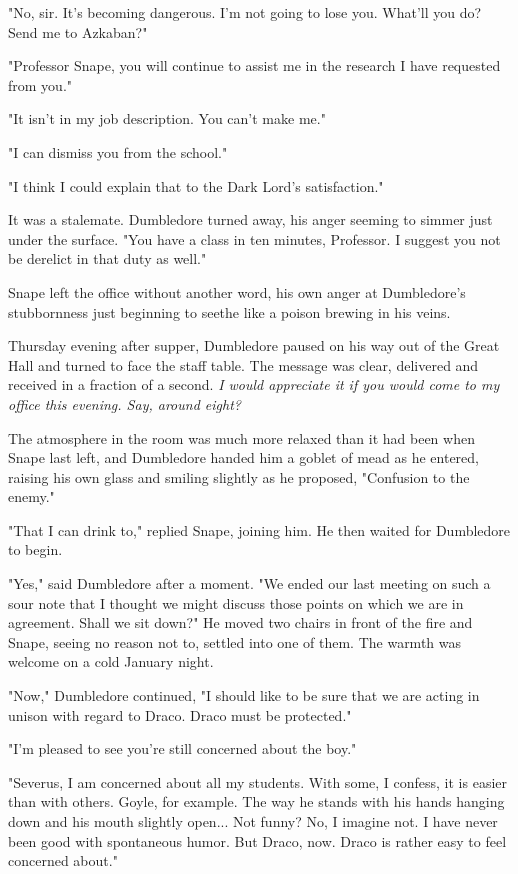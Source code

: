 \documentclass[a4paper,11pt]{article}
\begin{document}
"No, sir. It's becoming dangerous. I'm not going to lose you. What'll you do? Send me to Azkaban?"

"Professor Snape, you will continue to assist me in the research I have requested from you."

"It isn't in my job description. You can't make me."

"I can dismiss you from the school."

"I think I could explain that to the Dark Lord's satisfaction."

It was a stalemate. Dumbledore turned away, his anger seeming to simmer just under the surface. "You have a class in ten minutes, Professor. I suggest you not be derelict in that duty as well."

Snape left the office without another word, his own anger at Dumbledore's stubbornness just beginning to seethe like a poison brewing in his veins.

Thursday evening after supper, Dumbledore paused on his way out of the Great Hall and turned to face the staff table. The message was clear, delivered and received in a fraction of a second. \emph{I would appreciate it if you would come to my office this evening. Say, around eight?}

The atmosphere in the room was much more relaxed than it had been when Snape last left, and Dumbledore handed him a goblet of mead as he entered, raising his own glass and smiling slightly as he proposed, "Confusion to the enemy."

"That I can drink to," replied Snape, joining him. He then waited for Dumbledore to begin.

"Yes," said Dumbledore after a moment. "We ended our last meeting on such a sour note that I thought we might discuss those points on which we are in agreement. Shall we sit down?" He moved two chairs in front of the fire and Snape, seeing no reason not to, settled into one of them. The warmth was welcome on a cold January night.

"Now," Dumbledore continued, "I should like to be sure that we are acting in unison with regard to Draco. Draco must be protected."

"I'm pleased to see you're still concerned about the boy."

"Severus, I am concerned about all my students. With some, I confess, it is easier than with others. Goyle, for example. The way he stands with his hands hanging down and his mouth slightly open... Not funny? No, I imagine not. I have never been good with spontaneous humor. But Draco, now. Draco is rather easy to feel concerned about."
\end{document}
